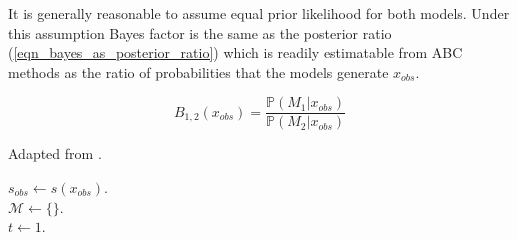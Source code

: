 \documentclass[11pt,a4paper]{article}
\newcommand*{\prob}{\mathbb{P}}
\theoremstyle{break}
\begin{document}
  \par It is generally reasonable to assume equal prior likelihood for both models. Under this assumption Bayes factor is the same as the posterior ratio (\ref{eqn_bayes_as_posterior_ratio}) which is readily estimatable from ABC methods as the ratio of probabilities that the models generate $x_{obs}$.

  \begin{equation}\label{eqn_bayes_as_posterior_ratio}
    B_{1,2}(x_{obs})=\frac{\prob(M_1|x_{obs})}{\prob(M_2|x_{obs})}
  \end{equation}

  \begin{box_algorithm}\label{alg_abc_mc}
    Adapted from \cite[]{abc_likelihood_free_methods_for_model_choice_in_gibbs_random_fields}.
    \par
    \begin{algorithm}[H]
      $s_{obs}\leftarrow s(x_{obs})$.\\
      $\mathcal{M}\leftarrow\{\}$.\\
      $t\leftarrow1$.\\
    \end{algorithm}
  \end{box_algorithm}
\end{document}
